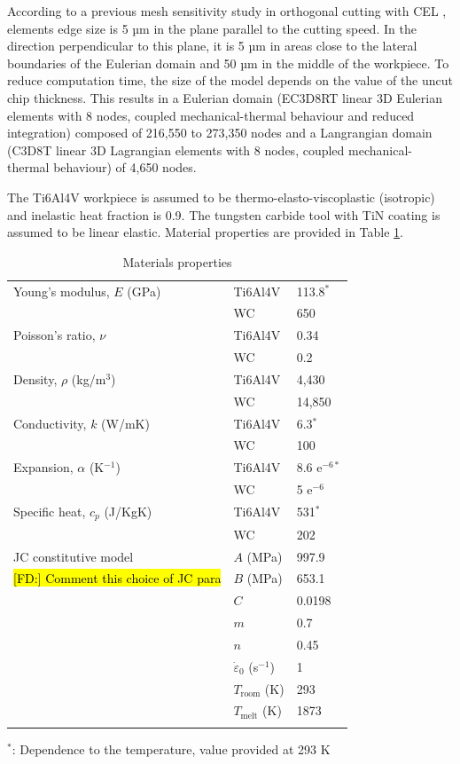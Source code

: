 \documentclass[final,5p,times,twocolumn]{elsarticle}
\DeclareRobustCommand{\FD}[1]{ {\begingroup\sethlcolor{VWgreen}\textcolor{black}{\hl{[FD:] #1}}\endgroup} }
\begin{document}
According to a previous mesh sensitivity study in orthogonal cutting with CEL \cite{ducobu_finite_2017}, elements edge size is 5 µm in the plane parallel to the cutting speed. In the direction perpendicular to this plane, it is 5 µm in areas close to the lateral boundaries of the Eulerian domain and 50 µm in the middle of the workpiece. To reduce computation time, the size of the model depends on the value of the uncut chip thickness. This results in a Eulerian domain (EC3D8RT linear 3D Eulerian elements with 8 nodes, coupled mechanical-thermal behaviour and reduced integration) composed of 216,550 to 273,350 nodes and a Langrangian domain (C3D8T linear 3D Lagrangian elements with 8 nodes, coupled mechanical-thermal behaviour) of 4,650 nodes.

The Ti6Al4V workpiece is assumed to be thermo-elasto-viscoplastic (isotropic) and inelastic heat fraction is 0.9. The tungsten carbide tool with TiN coating is assumed to be linear elastic. Material properties are provided in Table \ref{tab:prop}.

%
\begin{table}[!h]
\begin{center}
\caption{\label{tab:prop} Materials properties \cite{Seo2004, Granta, Milosevic}}
\begin{tabular}{lll}
\hline\noalign{\smallskip}
Young's modulus, $E$ (GPa) & Ti6Al4V & 113.8$^*$\\
 & WC & 650\\
Poisson's ratio, $\nu$ & Ti6Al4V & 0.34\\
 & WC & 0.2\\
Density, $\rho$ (kg/m$^3$) & Ti6Al4V & 4,430\\
 & WC & 14,850\\
Conductivity, $k$ (W/mK) & Ti6Al4V & 6.3$^*$\\
 & WC & 100\\
Expansion, $\alpha$ (K$^{-1}$) & Ti6Al4V & 8.6 e$^{-6*}$\\
 & WC & 5 e$^{-6}$\\
Specific heat, $c_{p}$ (J/KgK) & Ti6Al4V & 531$^*$\\
 & WC & 202\\
\noalign{\smallskip}\hline\noalign{\smallskip}
JC constitutive model & $A$ (MPa) & 997.9\\
\FD{Comment this choice of JC para} & $B$ (MPa) & 653.1\\
 & $C$ & 0.0198\\
 & $m$ & 0.7\\
 & $n$ & 0.45\\
 & $\dot{\varepsilon}_{0}$ (s$^{-1}$) & 1\\
 & $T_{\text{room}}$ (K) & 293\\
 & $T_{\text{melt}}$ (K) & 1873\\
\noalign{\smallskip}\hline\noalign{\smallskip}
\end{tabular}
\end{center}
\vspace{-0.4cm}$^*$: Dependence to the temperature, value provided at 293 K
\end{table}
%
\end{document}
